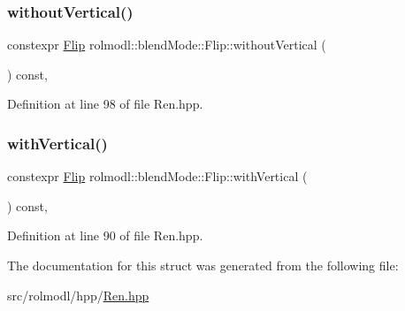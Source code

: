 \subsubsection{\texorpdfstring{withoutVertical()}{withoutVertical()}}
{\footnotesize\ttfamily constexpr \mbox{\hyperlink{structrolmodl_1_1blend_mode_1_1_flip}{Flip}} rolmodl\+::blend\+Mode\+::\+Flip\+::without\+Vertical (\begin{DoxyParamCaption}{ }\end{DoxyParamCaption}) const\hspace{0.3cm}{\ttfamily [inline]}, {\ttfamily [noexcept]}}



Definition at line 98 of file Ren.\+hpp.

\mbox{\label{structrolmodl_1_1blend_mode_1_1_flip_a77b30724efcc5b5608c63039ddc02c1d}} 
\subsubsection{\texorpdfstring{withVertical()}{withVertical()}}
{\footnotesize\ttfamily constexpr \mbox{\hyperlink{structrolmodl_1_1blend_mode_1_1_flip}{Flip}} rolmodl\+::blend\+Mode\+::\+Flip\+::with\+Vertical (\begin{DoxyParamCaption}{ }\end{DoxyParamCaption}) const\hspace{0.3cm}{\ttfamily [inline]}, {\ttfamily [noexcept]}}



Definition at line 90 of file Ren.\+hpp.



The documentation for this struct was generated from the following file\+:\begin{DoxyCompactItemize}
\item 
src/rolmodl/hpp/\mbox{\hyperlink{_ren_8hpp}{Ren.\+hpp}}\end{DoxyCompactItemize}
